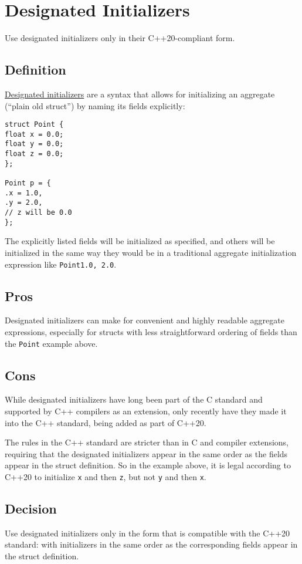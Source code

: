 
\section{Designated Initializers}\label{sec:designated-initializers}
Use designated initializers only in their C++20-compliant form.

\subsection{Definition}
\href{https://en.cppreference.com/w/cpp/language/aggregate_initialization#Designated_initializers}{Designated initializers} are a syntax that allows for initializing an aggregate (\enquote{plain old struct}) by naming its fields explicitly:
\begin{verbatim}
struct Point {
float x = 0.0;
float y = 0.0;
float z = 0.0;
};

Point p = {
.x = 1.0,
.y = 2.0,
// z will be 0.0
};
\end{verbatim}
The explicitly listed fields will be initialized as specified, and others will be initialized in the same way they would be in a traditional aggregate initialization expression like \texttt{Point{1.0, 2.0}}.

\subsection{Pros}
Designated initializers can make for convenient and highly readable aggregate expressions, especially for structs with less straightforward ordering of fields than the \texttt{Point} example above.

\subsection{Cons}
While designated initializers have long been part of the C standard and supported by C++ compilers as an extension, only recently have they made it into the C++ standard, being added as part of C++20.

The rules in the C++ standard are stricter than in C and compiler extensions, requiring that the designated initializers appear in the same order as the fields appear in the struct definition. So in the example above, it is legal according to C++20 to initialize \texttt{x} and then \texttt{z}, but not \texttt{y} and then \texttt{x}.


\subsection{Decision}
Use designated initializers only in the form that is compatible with the C++20 standard: with initializers in the same order as the corresponding fields appear in the struct definition.

